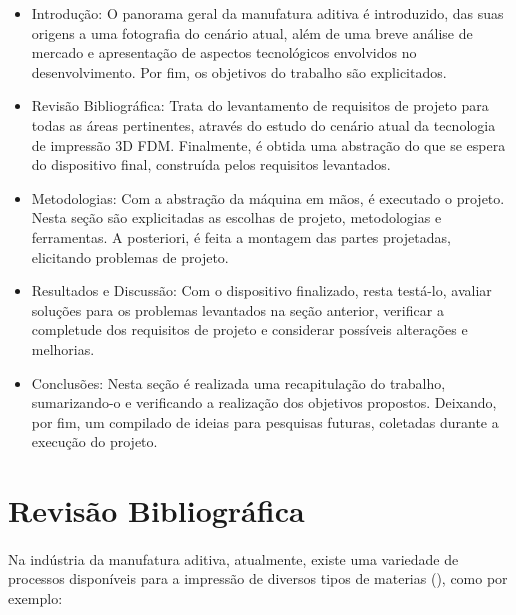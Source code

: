 \documentclass[12pt, english]{article}
\begin{document}
\begin{itemize}
\item Introdução: O panorama geral da manufatura aditiva é introduzido, das suas origens a uma fotografia do cenário atual, além de uma breve análise de mercado e apresentação de aspectos tecnológicos envolvidos no desenvolvimento. Por fim, os objetivos do trabalho são explicitados.
\item Revisão Bibliográfica: Trata do levantamento de requisitos de projeto para todas as áreas pertinentes, através do estudo do cenário atual da tecnologia de impressão 3D FDM. Finalmente, é obtida uma abstração do que se espera do dispositivo final, construída pelos requisitos levantados.
\item Metodologias: Com a abstração da máquina em mãos, é executado o projeto. Nesta seção são explicitadas as escolhas de projeto, metodologias e ferramentas. A posteriori, é feita a montagem das partes projetadas, elicitando problemas de projeto.
\item Resultados e Discussão: Com o dispositivo finalizado, resta testá-lo, avaliar soluções para os problemas levantados na seção anterior, verificar a completude dos requisitos de projeto e considerar possíveis alterações e melhorias.
\item Conclusões: Nesta seção é realizada uma recapitulação do trabalho, sumarizando-o e verificando a realização dos objetivos propostos. Deixando, por fim, um compilado de ideias para pesquisas futuras, coletadas durante a execução do projeto.
\end{itemize}

\pagebreak

\section{Revisão Bibliográfica}

\paragraph{}
Na indústria da manufatura aditiva, atualmente, existe uma variedade de processos disponíveis para a impressão de diversos tipos de materias (\cite{Kafle2021}), como por exemplo:
\end{document}
